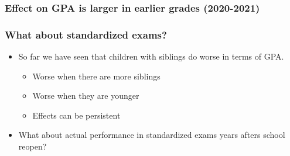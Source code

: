\documentclass{beamer}
\begin{document}
\begin{frame}
    \label{frame:twfe_gpa_2_4_6_8}
    \frametitle{Effect on GPA is larger in earlier grades (2020-2021)}
        {
    }
\end{frame}

\begin{frame}
    \label{frame:recap1}
    \frametitle{What about standardized exams?}
    \begin{itemize}
       \item So far we have seen that children with siblings do worse in terms of GPA.
        \begin{itemize}
            \item Worse when there are more siblings
            \item Worse when they are younger
            \item Effects can be persistent
        \end{itemize}
        \item What about actual performance in standardized exams years afters school reopen?
    \end{itemize}
\end{frame}
\end{document}
